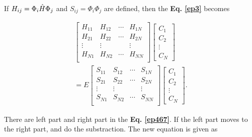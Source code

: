 \documentclass[a4paper, 12pt, titlepage,oneside,drop]{kthesis}
\begin{document}
If $H_{ij} = \Phi_i \hat{H} \Phi_j$ and $S_{ij} = \Phi_i \Phi_j$ are defined, then the \textbf{Eq. \ref{ep3}} becomes

\begin{equation}\begin{split}\label{ep467}
\left[
\begin{matrix}
    H_{11} & H_{12} & \cdots & H_{1N} \\
    H_{21} & H_{22} & \cdots & H_{2N} \\
    \vdots               & \vdots               &        & \vdots               \\
     H_{N1} & H_{N2} & \cdots & H_{NN} \\
\end{matrix} \right] \left[ \begin{array}{c} C_1 \\ C_2 \\ \vdots \\ C_N\end{array} \right] \\
= E \left[
\begin{matrix}
    S_{11} & S_{12} & \cdots & S_{1N} \\
    S_{21} & S_{22} & \cdots & S_{2N} \\
    \vdots               & \vdots               &        & \vdots               \\
     S_{N1} & S_{N2} & \cdots & S_{NN} \\
\end{matrix} \right]\left[ \begin{array}{c} C_1 \\ C_2 \\ \vdots \\ C_N\end{array} \right].
\end{split}\end{equation}

There are left part and right part in the \textbf{Eq. \ref{ep467}}. If the left part moves to the right part, and do the substraction. The new equation is given as 
\end{document}

